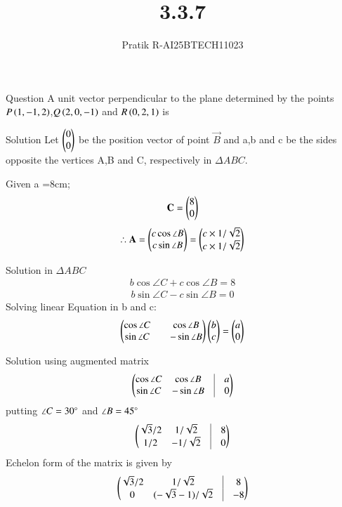 \documentclass{beamer}
\title %
{3.3.7}
\author %
{Pratik R-AI25BTECH11023}
\begin{document}
\frame{\titlepage}
\begin{frame}{Question}
A unit vector perpendicular to the plane determined by the points
$P\left(1,-1,2\right)$,$Q\left(2,0,-1\right)$ and $R\left(0,2,1\right)$ is 
\end{frame}
\begin{frame}{Solution}
Let $\begin{pmatrix}0\\0\end{pmatrix}$ be the position vector of point $\vec{B}$ and a,b and c be the sides opposite the vertices A,B and C, respectively in $\Delta ABC$.

Given a =8cm;
\begin{align}
    \mathbf{C}=\begin{pmatrix}8\\0\end{pmatrix}
\end{align}
\begin{align}
    \therefore \mathbf{A}=\begin{pmatrix}c \cos \angle B\\c \sin \angle B\end{pmatrix}= \begin{pmatrix}c\times 1/\sqrt{2}\\c\times 1/\sqrt{2}\end{pmatrix}
\end{align}
\end{frame}
\begin{frame}{Solution}
in $\Delta ABC$
\begin{align}
   b \cos \angle C + c \cos \angle B = 8
\end{align}
\begin{align}
    b \sin \angle C - c \sin \angle B = 0
\end{align}
Solving linear Equation in b and c:
\begin{align}
    \begin{pmatrix}\cos \angle C && \cos \angle B \\
    \sin \angle C && -\sin \angle B\end{pmatrix} \begin{pmatrix}b \\ c\end{pmatrix} = \begin{pmatrix}a\\0\end{pmatrix}
\end{align}
\end{frame}
\begin{frame}{Solution}
using augmented matrix
\begin{align}
     \myvec{\cos \angle C & \cos \angle B &\vrule &a \\
    \sin \angle C & -\sin \angle B &\vrule &0} 
\end{align}
putting $\angle C = 30\degree$ and $\angle B = 45\degree$
\begin{align}
    \myvec{\sqrt{3}/2 & 1/\sqrt{2} &\vrule &8 \\
    1/2 & -1/\sqrt{2} &\vrule &0}
\end{align}
Echelon form of the matrix is given by 
\begin{align}
    \myvec{\sqrt{3}/2 & 1/\sqrt{2} &\vrule &8 \\
    0 & (-\sqrt{3}-1)/\sqrt{2} &\vrule &-8}
\end{align}
\end{frame}
\end{document}
